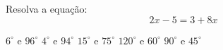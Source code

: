 Resolva a equação:
\[2x-5=3+8x\]

$6^\circ$ e $96^\circ$
$4^\circ$ e $94^\circ$
$15^\circ$ e $75^\circ$
$120^\circ$ e $60^\circ$
$90^\circ$ e $45^\circ$




